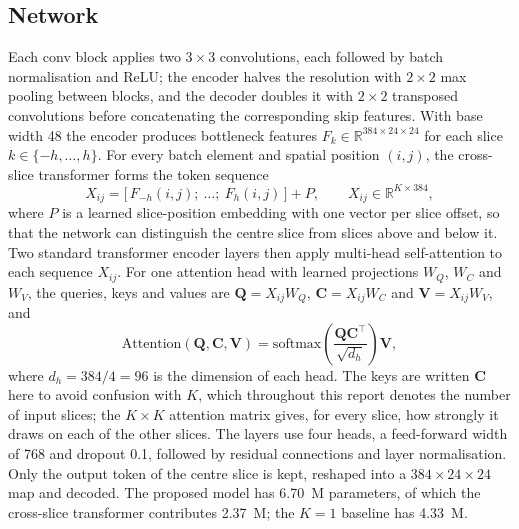 \subsection{Network}
Each conv block applies two $3 \times 3$ convolutions, each followed by batch normalisation and ReLU; the encoder halves the resolution with $2 \times 2$ max pooling between blocks, and the decoder doubles it with $2 \times 2$ transposed convolutions before concatenating the corresponding skip features. With base width 48 the encoder produces bottleneck features $F_k \in \mathbb{R}^{384 \times 24 \times 24}$ for each slice $k \in \{-h, \dots, h\}$. For every batch element and spatial position $(i,j)$, the cross-slice transformer forms the token sequence
\begin{equation}
X_{ij} = \big[\,F_{-h}(i,j);\ \dots;\ F_{h}(i,j)\,\big] + P, \qquad X_{ij} \in \mathbb{R}^{K \times 384},
\end{equation}
where $P$ is a learned slice-position embedding with one vector per slice offset, so that the network can distinguish the centre slice from slices above and below it. Two standard transformer encoder layers \cite{vaswani2017} then apply multi-head self-attention to each sequence $X_{ij}$. For one attention head with learned projections $W_Q$, $W_C$ and $W_V$, the queries, keys and values are $\mathbf{Q} = X_{ij}W_Q$, $\mathbf{C} = X_{ij}W_C$ and $\mathbf{V} = X_{ij}W_V$, and
\begin{equation}
\mathrm{Attention}(\mathbf{Q},\mathbf{C},\mathbf{V}) = \mathrm{softmax}\!\left(\frac{\mathbf{Q}\mathbf{C}^{\top}}{\sqrt{d_h}}\right)\mathbf{V},
\end{equation}
where $d_h = 384/4 = 96$ is the dimension of each head. The keys are written $\mathbf{C}$ here to avoid confusion with $K$, which throughout this report denotes the number of input slices; the $K \times K$ attention matrix gives, for every slice, how strongly it draws on each of the other slices. The layers use four heads, a feed-forward width of 768 and dropout 0.1, followed by residual connections and layer normalisation. Only the output token of the centre slice is kept, reshaped into a $384 \times 24 \times 24$ map and decoded. The proposed model has 6.70~M parameters, of which the cross-slice transformer contributes 2.37~M; the $K=1$ baseline has 4.33~M.

